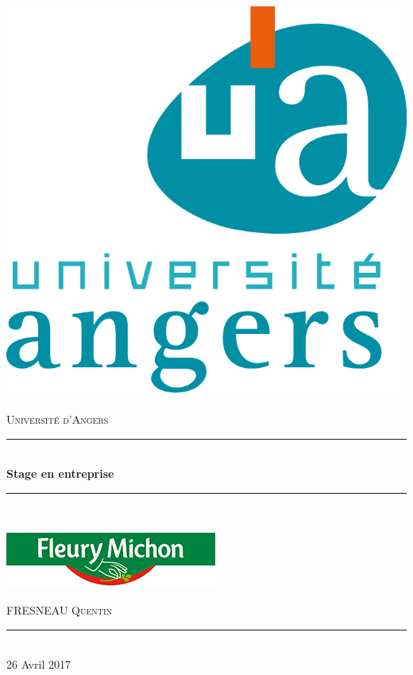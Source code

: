 \documentclass[a4paper,12pt]{extarticle}
\newcommand{\HRule}{\rule{\linewidth}{0.5mm}}
\begin{document}
\begin{titlepage}
  \begin{sffamily}
  \begin{center}


    \includegraphics[scale=0.5]{Img/logo/logo_iutangers}~\\[1.5cm] 
 
 
     \textsc{\LARGE Université d'Angers}\\[2cm] 


    \HRule \\[0.4cm]
    { \huge \bfseries Stage en entreprise}{\bfseries  \\[0.4cm]}
    \HRule \\[2cm]
    
	\begin{center}
		\includegraphics[scale=1]{Img/logo/logo_fleurymichon}
	\end{center}
    
    \begin{minipage}{0.4\textwidth}
      \begin{flushleft} \large
        FRESNEAU \textsc{Quentin}
      \end{flushleft}
    \end{minipage}
    

    \vfill
    \HRule\\[2cm]
    {\large 26 Avril 2017}

  \end{center}
  \end{sffamily}
\end{titlepage}
\end{document}
